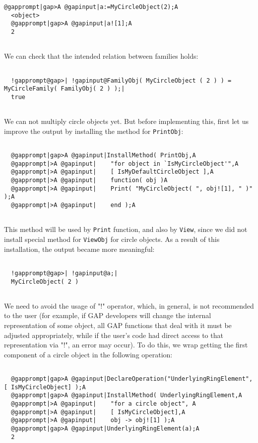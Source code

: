\documentclass[a4paper,11pt]{report}
\begin{document}
{{\begin{Verbatim}[commandchars=@|A,fontsize=\small,frame=single,label=Example]
  @gapprompt|gap>A @gapinput|a:=MyCircleObject(2);A
  <object>
  @gapprompt|gap>A @gapinput|a![1];A
  2
  
\end{Verbatim}
 We can check that the intended relation between families holds: 

 
\begin{Verbatim}[commandchars=!@|,fontsize=\small,frame=single,label=Example]
  
  !gapprompt@gap>| !gapinput@FamilyObj( MyCircleObject ( 2 ) ) = MyCircleFamily( FamilyObj( 2 ) );|
  true
  
\end{Verbatim}
 We can not multiply circle objects yet. But before implementing this, first
let us improve the output by installing the method for \texttt{PrintObj}: 
\begin{Verbatim}[commandchars=@|A,fontsize=\small,frame=single,label=Example]
  
  @gapprompt|gap>A @gapinput|InstallMethod( PrintObj,A
  @gapprompt|>A @gapinput|    "for object in `IsMyCircleObject'",A
  @gapprompt|>A @gapinput|    [ IsMyDefaultCircleObject ],A
  @gapprompt|>A @gapinput|    function( obj )A
  @gapprompt|>A @gapinput|    Print( "MyCircleObject( ", obj![1], " )" );A
  @gapprompt|>A @gapinput|    end );A
  
\end{Verbatim}
 This method will be used by \texttt{Print} function, and also by \texttt{View}, since we did not install special method for \texttt{ViewObj} for circle objects. As a result of this installation, the output became more
meaningful: 
\begin{Verbatim}[commandchars=!@|,fontsize=\small,frame=single,label=Example]
  
  !gapprompt@gap>| !gapinput@a;|
  MyCircleObject( 2 )
  
\end{Verbatim}
 We need to avoid the usage of "!" operator, which, in general, is not
recommended to the user (for example, if \textsf{GAP} developers will change the internal representation of some object, all \textsf{GAP} functions that deal with it must be adjusted appropriately, while if the
user's code had direct access to that representation via "!", an error may
occur). To do this, we wrap getting the first component of a circle object in
the following operation: 
\begin{Verbatim}[commandchars=@|A,fontsize=\small,frame=single,label=Example]
  
  @gapprompt|gap>A @gapinput|DeclareOperation("UnderlyingRingElement", [ IsMyCircleObject] );A
  @gapprompt|gap>A @gapinput|InstallMethod( UnderlyingRingElement,A
  @gapprompt|>A @gapinput|    "for a circle object", A
  @gapprompt|>A @gapinput|    [ IsMyCircleObject],A
  @gapprompt|>A @gapinput|    obj -> obj![1] );A
  @gapprompt|gap>A @gapinput|UnderlyingRingElement(a);A
  2
  

\end{Verbatim}}}
\end{document}
